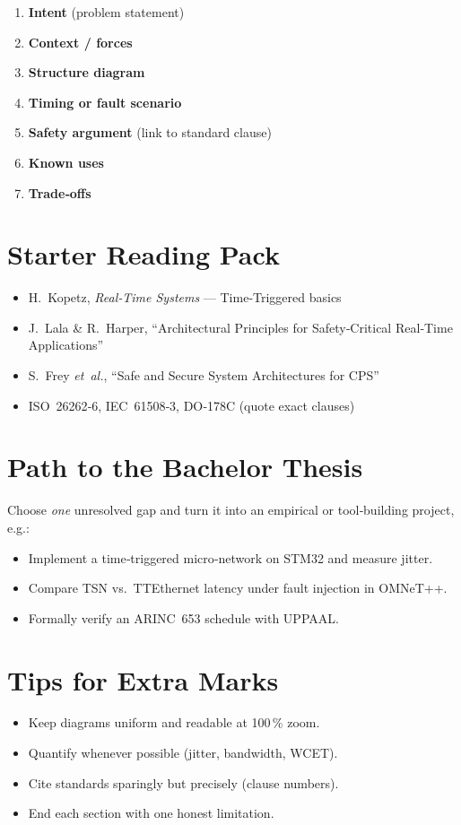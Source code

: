 \documentclass[11pt,a4paper]{article}
\begin{document}
\begin{enumerate}[label=\arabic*.]
  \item \textbf{Intent} (problem statement)
  \item \textbf{Context / forces}
  \item \textbf{Structure diagram}
  \item \textbf{Timing or fault scenario}
  \item \textbf{Safety argument} (link to standard clause)
  \item \textbf{Known uses}
  \item \textbf{Trade‑offs}
\end{enumerate}

\section{Starter Reading Pack}

\begin{itemize}[itemsep=0.3em]
  \item H.~Kopetz, \emph{Real‑Time Systems} --- Time‑Triggered basics
  \item J.~Lala \& R.~Harper, ``Architectural Principles for Safety‑Critical Real‑Time Applications''
  \item S.~Frey \emph{et al.}, ``Safe and Secure System Architectures for CPS''
  \item ISO 26262‑6, IEC 61508‑3, DO‑178C (quote exact clauses)
\end{itemize}

\section{Path to the Bachelor Thesis}

Choose \emph{one} unresolved gap and turn it into an empirical or tool‑building project, e.g.:

\begin{itemize}[itemsep=0.3em]
  \item Implement a time‑triggered micro‑network on STM32 and measure jitter.
  \item Compare TSN vs.\ TTEthernet latency under fault injection in OMNeT++.
  \item Formally verify an ARINC 653 schedule with UPPAAL.
\end{itemize}

\section{Tips for Extra Marks}

\begin{itemize}[itemsep=0.3em]
  \item Keep diagrams uniform and readable at 100\,\% zoom.
  \item Quantify whenever possible (jitter, bandwidth, WCET).
  \item Cite standards sparingly but precisely (clause numbers).
  \item End each section with one honest limitation.
\end{itemize}
\end{document}
